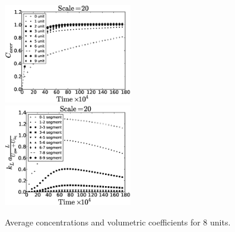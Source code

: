 \documentclass{article}
\begin{document}
\begin{figure}[htb!]
\includegraphics[width=0.5\textwidth]{Figures/aver_units10scale20.eps}\hfill
\includegraphics[width=0.5\textwidth]{Figures/coeff_units10scale20.eps}\\
\caption{Average concentrations and volumetric coefficients for $8$ units.
\label{fig:unit:10}}
\end{figure}
\end{document}
